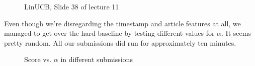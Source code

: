 \documentclass[a4paper, 11pt]{article}
\begin{document}
\begin{figure}[htbp]
\begin{center}
\setlength{\fboxsep}{0pt}%
\setlength{\fboxrule}{1pt}%
%

\caption{LinUCB, Slide 38 of lecture 11}
\label{default}
\end{center}
\end{figure}

Even though we're disregarding the timestamp and article features at all, we managed to get over the hard-baseline by testing different values for $\alpha$. It seems pretty random. All our submissions did run for approximately ten minutes.

\begin{figure}[htbp]
\begin{center}
%

\caption{Score vs. $\alpha$ in different submissions}
\label{default}
\end{center}
\end{figure}
\end{document}
